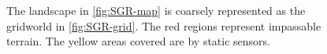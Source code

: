 \begin{figure}
\centering
{}
{}


\caption{The landscape in \ref{fig:SGR-map} is coarsely represented as the gridworld in \ref{fig:SGR-grid}. The red regions represent impassable terrain. The yellow areas covered are by static sensors.}\vspace{-0.5cm}
\label{fig:casestudy}
\end{figure}

